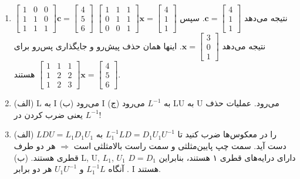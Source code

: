 \documentclass[12pt,a4paper]{article}
\begin{document}
{\begin{enumerate}
			\item $\begin{bmatrix} 1 & 0 & 0 \\ 1 & 1 & 0 \\ 1 & 1 & 1 \end{bmatrix} \boldsymbol{c} = \begin{bmatrix} 4 \\ 5 \\ 6 \end{bmatrix}$ نتیجه می‌دهد $\boldsymbol{c} = \begin{bmatrix} 4 \\ 1 \\ 1 \end{bmatrix}$. سپس $\begin{bmatrix} 1 & 1 & 1 \\ 0 & 1 & 1 \\ 0 & 0 & 1 \end{bmatrix} \boldsymbol{x} = \begin{bmatrix} 4 \\ 1 \\ 1 \end{bmatrix}$ نتیجه می‌دهد $\boldsymbol{x} = \begin{bmatrix} 3 \\ 0 \\ 1 \end{bmatrix}$.
			اینها همان حذف پیش‌رو و جایگذاری پس‌رو برای $\begin{bmatrix} 1 & 1 & 1 \\ 1 & 2 & 2 \\ 1 & 2 & 3 \end{bmatrix} \boldsymbol{x} = \begin{bmatrix} 4 \\ 5 \\ 6 \end{bmatrix}$ هستند.
			
			\item (الف) L به I می‌رود (ب) I به $L^{-1}$ می‌رود (ج) LU به U می‌رود. عملیات حذف یعنی ضرب کردن در $L^{-1}$!
			
			\item (الف) $LDU=L_1D_1U_1$ را در معکوس‌ها ضرب کنید تا $L_1^{-1}LD = D_1U_1U^{-1}$ به دست آید. سمت چپ پایین‌مثلثی و سمت راست بالا‌مثلثی است $\Rightarrow$ هر دو طرف قطری هستند.
			(ب) L, U, $L_1$, $U_1$ دارای درایه‌های قطری ۱ هستند، بنابراین $D=D_1$. آنگاه $L_1^{-1}L$ و $U_1U^{-1}$ هر دو برابر I هستند.
			

\end{enumerate}}
\end{document}
